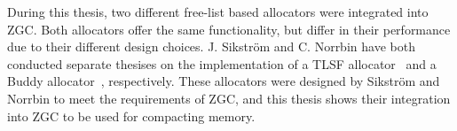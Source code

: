During this thesis, two different free-list based allocators were integrated into ZGC. Both allocators offer the same functionality, but differ in their performance due to their different design choices. J. Sikström and C. Norrbin have both conducted separate thesises on the implementation of a TLSF allocator~\cite{joel} and a Buddy allocator~\cite{casper}, respectively. These allocators were designed by Sikström and Norrbin to meet the requirements of ZGC, and this thesis shows their integration into ZGC to be used for compacting memory. 
